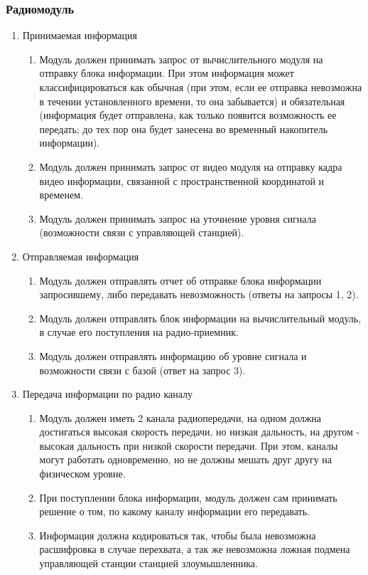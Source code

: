 \documentclass[utf8]{report}
\begin{document}
\subsubsection{Радиомодуль}
\begin{enumerate}
  \item Принимаемая информация
  \begin{enumerate}
    \item Модуль должен принимать запрос от вычислительного модуля на отправку блока информации. При этом информация может классифицироваться как обычная (при этом, если ее отправка невозможна в течении установленного времени, то она забывается) и обязательная (информация будет отправлена, как только появится возможность ее передать; до тех пор она будет занесена во временный накопитель информации).
    \item Модуль должен принимать запрос от видео модуля на отправку кадра видео информации, связанной с пространственной координатой и временем.
    \item Модуль должен принимать запрос на уточнение уровня сигнала (возможности связи с управляющей станцией).
  \end{enumerate}
  \item Отправляемая информация
  \begin{enumerate}
    \item Модуль должен отправлять отчет об отправке блока информации запросившему, либо передавать невозможность (ответы на запросы 1, 2).
    \item Модуль должен отправлять блок информации на вычислительный модуль, в случае его поступления на радио-приемник.
    \item Модуль должен отправлять информацию об уровне сигнала и возможности связи с базой (ответ на запрос 3).
  \end{enumerate}
  \item Передача информации по радио каналу
  \begin{enumerate}
    \item Модуль должен иметь 2 канала радиопередачи, на одном должна достигаться высокая скорость передачи, но низкая дальность, на другом - высокая дальность при низкой скорости передачи. При этом, каналы могут работать одновременно, но не должны мешать друг другу на физическом уровне.
    \item При поступлении блока информации, модуль должен сам принимать решение о том, по какому каналу информации его передавать.
    \item Информация должна кодироваться так, чтобы была невозможна расшифровка в случае перехвата, а так же невозможна ложная подмена управляющей станции станцией злоумышленника.
  \end{enumerate}
\end{enumerate}
\end{document}
